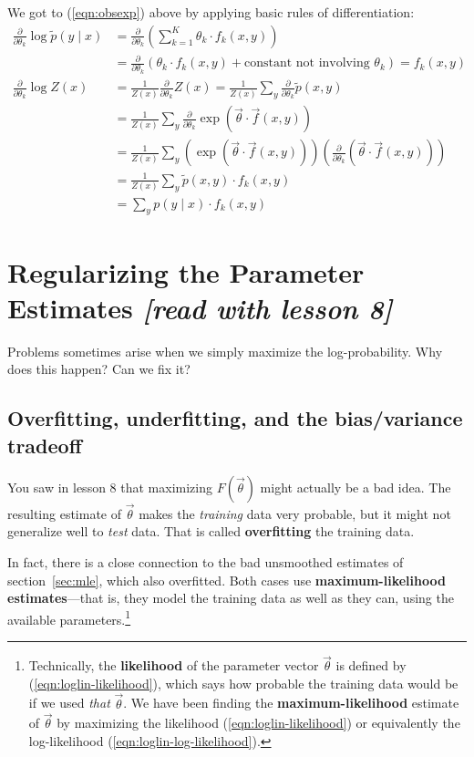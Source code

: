 \documentclass[11pt]{article}
\newcommand{\vtheta}{\vec{\theta}}
\newcommand{\ptilde}{\tilde{p}}
\newcommand{\diffk}{\frac{\partial}{\partial \theta_k}}
\begin{document}
We got to (\ref{eqn:obsexp}) above by applying basic rules
of differentiation:
\begin{align}
  \diffk \log \ptilde(y \mid x)
  &= \diffk \left( \sum_{k=1}^K \theta_k \cdot f_k(x,y) \right) \\
  & = \diffk \left( \theta_k \cdot f_k(x,y) + \textrm{constant not involving $\theta_k$} \right) = f_k(x,y)\\
%
  \diffk \log Z(x) &= \frac{1}{Z(x)} \diffk Z(x)
  = \frac{1}{Z(x)} \sum_y \diffk \ptilde(x,y)  \\
  &= \frac{1}{Z(x)} \sum_y \diffk \exp (\vtheta \cdot \vec{f}(x,y))\\
  &= \frac{1}{Z(x)} \sum_y \left( \exp (\vtheta \cdot \vec{f}(x,y)) \right)
  \left( \diffk (\vtheta \cdot \vec{f}(x,y)) \right) \\
  &= \frac{1}{Z(x)} \sum_y \ptilde(x,y) \cdot f_k(x,y) \\
  &= \sum_y p(y\mid x) \cdot f_k(x,y)
\end{align}

\section{Regularizing the Parameter Estimates {\em [read with lesson 8]}}

Problems sometimes arise when we simply maximize the log-probability.
Why does this happen?  Can we fix it?

\subsection{Overfitting, underfitting, and the bias/variance tradeoff}

You saw in lesson 8 that maximizing $F(\vtheta)$ might actually be a
bad idea.  The resulting estimate of $\vtheta$ makes the {\em
  training} data very probable, but it might not generalize well to
{\em test} data.  That is called {\bf overfitting} the training data.

In fact, there is a close connection to the bad unsmoothed estimates
of section~\ref{sec:mle}, which also overfitted.  Both cases use {\bf
  maximum-likelihood estimates}---that is, they model the training
data as well as they can, using the available
parameters.\footnote{Technically, the {\bf likelihood} of the
  parameter vector $\vtheta$ is defined by
  (\ref{eqn:loglin-likelihood}), which says how probable the training
  data would be if we used {\em that} $\vtheta$.  We have been finding
  the {\bf maximum-likelihood} estimate of $\vtheta$ by maximizing the
  likelihood (\ref{eqn:loglin-likelihood}) or equivalently the
  log-likelihood (\ref{eqn:loglin-log-likelihood}).}
\end{document}
